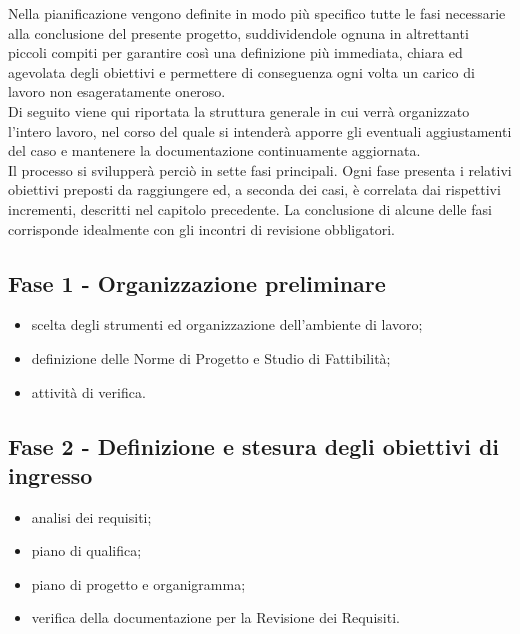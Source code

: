 Nella pianificazione vengono definite in modo più specifico tutte le fasi necessarie alla conclusione del presente progetto, suddividendole ognuna in altrettanti piccoli compiti per garantire così una definizione più immediata, chiara ed agevolata degli obiettivi e permettere di conseguenza ogni volta un carico di lavoro non esageratamente oneroso. \\
Di seguito viene qui riportata la struttura generale in cui verrà organizzato l'intero lavoro, nel corso del quale si intenderà apporre gli eventuali aggiustamenti del caso e mantenere la documentazione continuamente aggiornata. \\
Il processo si svilupperà perciò in sette fasi principali. Ogni fase presenta i relativi obiettivi preposti da raggiungere ed, a seconda dei casi, è correlata dai rispettivi incrementi, descritti nel capitolo precedente. La conclusione di alcune delle fasi corrisponde idealmente con gli incontri di revisione obbligatori. 

    \subsection{Fase 1 - Organizzazione preliminare}
        \begin{itemize}
            \item scelta degli strumenti ed organizzazione dell'ambiente di lavoro;
            \item definizione delle Norme di Progetto e Studio di Fattibilità;
            \item attività di verifica.
        \end{itemize}
            
    \subsection{Fase 2 - Definizione e stesura degli obiettivi di ingresso}
        \begin{itemize}
            \item analisi dei requisiti;
            \item piano di qualifica;
            \item piano di progetto e organigramma;
            \item verifica della documentazione per la Revisione dei Requisiti.
        \end{itemize}
    
